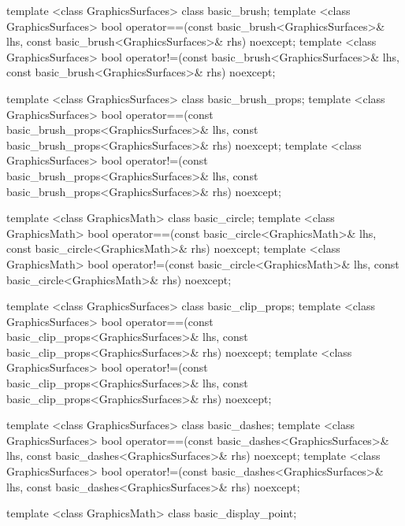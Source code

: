 \begin{codeblock}
{{    template <class GraphicsSurfaces>
    class basic_brush;
    template <class GraphicsSurfaces>
    bool operator==(const basic_brush<GraphicsSurfaces>& lhs,
      const basic_brush<GraphicsSurfaces>& rhs) noexcept;
    template <class GraphicsSurfaces>
    bool operator!=(const basic_brush<GraphicsSurfaces>& lhs,
      const basic_brush<GraphicsSurfaces>& rhs) noexcept;

    template <class GraphicsSurfaces>
    class basic_brush_props;
    template <class GraphicsSurfaces>
    bool operator==(const basic_brush_props<GraphicsSurfaces>& lhs,
      const basic_brush_props<GraphicsSurfaces>& rhs) noexcept;
    template <class GraphicsSurfaces>
    bool operator!=(const basic_brush_props<GraphicsSurfaces>& lhs,
      const basic_brush_props<GraphicsSurfaces>& rhs) noexcept;
    
    template <class GraphicsMath>
    class basic_circle;
    template <class GraphicsMath>
    bool operator==(const basic_circle<GraphicsMath>& lhs,
      const basic_circle<GraphicsMath>& rhs) noexcept;
    template <class GraphicsMath>
    bool operator!=(const basic_circle<GraphicsMath>& lhs,
      const basic_circle<GraphicsMath>& rhs) noexcept;
    
    template <class GraphicsSurfaces>
    class basic_clip_props;
    template <class GraphicsSurfaces>
    bool operator==(const basic_clip_props<GraphicsSurfaces>& lhs,
      const basic_clip_props<GraphicsSurfaces>& rhs) noexcept;
    template <class GraphicsSurfaces>
    bool operator!=(const basic_clip_props<GraphicsSurfaces>& lhs,
      const basic_clip_props<GraphicsSurfaces>& rhs) noexcept;
    
    template <class GraphicsSurfaces>
    class basic_dashes;
    template <class GraphicsSurfaces>
    bool operator==(const basic_dashes<GraphicsSurfaces>& lhs,
      const basic_dashes<GraphicsSurfaces>& rhs) noexcept;
    template <class GraphicsSurfaces>
    bool operator!=(const basic_dashes<GraphicsSurfaces>& lhs,
      const basic_dashes<GraphicsSurfaces>& rhs) noexcept;
    
    template <class GraphicsMath>
    class basic_display_point;
    
}}
\end{codeblock}
